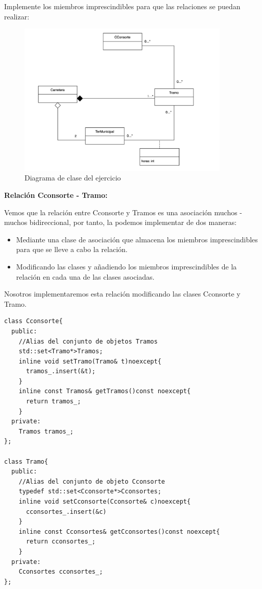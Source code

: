  Implemente los miembros imprescindibles para que las relaciones se puedan realizar:
\begin{figure}[h]
  \begin{center}
    \includegraphics[width=0.9\textwidth]{assets/Junio2023_1.png}
  \end{center}
  \caption{Diagrama de clase del ejercicio}
\end{figure}

\textbf{Relación Cconsorte - Tramo:}

Vemos que la relación entre Cconsorte y Tramos es una asociación muchos - muchos bidireccional, por tanto, la podemos implementar de dos maneras:
\begin{itemize}
  \item Mediante una clase de asociación que almacena los miembros imprescindibles para que se lleve a cabo la relación.
  \item Modificando las clases y añadiendo los miembros imprescindibles de la relación en cada una de las clases asociadas.
\end{itemize}
Nosotros implementaremos esta relación modificando las clases Cconsorte y Tramo.

\begin{verbatim}
class Cconsorte{
  public:
    //Alias del conjunto de objetos Tramos
    std::set<Tramo*>Tramos;
    inline void setTramo(Tramo& t)noexcept{
      tramos_.insert(&t);
    }
    inline const Tramos& getTramos()const noexcept{
      return tramos_;
    }
  private:
    Tramos tramos_;
};

class Tramo{
  public:
    //Alias del conjunto de objeto Cconsorte
    typedef std::set<Cconsorte*>Cconsortes;
    inline void setCconsorte(Cconsorte& c)noexcept{
      cconsortes_.insert(&c)
    }
    inline const Cconsortes& getCconsortes()const noexcept{
      return cconsortes_;
    }
  private:
    Cconsortes cconsortes_;
};
\end{verbatim}

